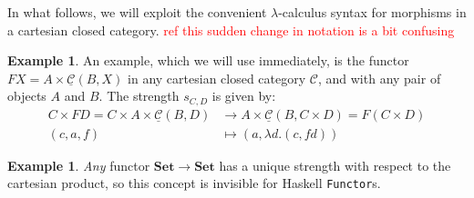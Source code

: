 \documentclass[11pt,a4paper]{article}
\theoremstyle{plain}
\theoremstyle{definition}
\newtheorem{example}[theorem]{Example}
\newcommand{\C}{\mathscr{C}}
\newcommand{\homC}{\underline{\C}}
\newcommand{\Set}{\mathbf{Set}}
\newcommand{\todo}[1]{\textcolor{red}{\small #1}}
\begin{document}
In what follows, we will exploit the convenient $\lambda$-calculus syntax for morphisms in a cartesian closed category. \todo{ref} \todo{this sudden change in notation is a bit confusing}

\begin{example}
  An example, which we will use immediately, is the functor $FX = A \times \homC(B, X)$ in any cartesian closed category $\C$, and with any pair of objects $A$ and $B$. The strength $s_{C,D}$ is given by:
  \begin{align*}
    C \times FD = C \times A \times \homC(B, D) &\to A \times \homC(B, C \times D) = F(C \times D)\\
    (c, a, f) &\mapsto (a, \lambda d. (c, fd))
  \end{align*}
\end{example}

\begin{example}
  \emph{Any} functor $\Set \to \Set$ has a unique strength with respect to the cartesian product, so this concept is invisible for Haskell \texttt{Functor}s. 
\end{example}
\end{document}
